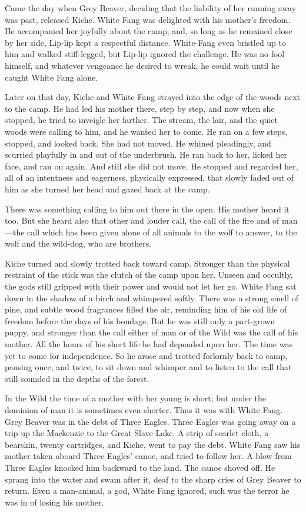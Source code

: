 \documentclass[10pt]{book}
\begin{document}
Came the day when Grey Beaver, deciding that the liability of her
running away was past, released Kiche. White Fang was delighted with
his mother’s freedom. He accompanied her joyfully about the camp; and,
so long as he remained close by her side, Lip-lip kept a respectful
distance. White-Fang even bristled up to him and walked stiff-legged,
but Lip-lip ignored the challenge. He was no fool himself, and whatever
vengeance he desired to wreak, he could wait until he caught White Fang
alone.

Later on that day, Kiche and White Fang strayed into the edge of the
woods next to the camp. He had led his mother there, step by step, and
now when she stopped, he tried to inveigle her farther. The stream, the
lair, and the quiet woods were calling to him, and he wanted her to
come. He ran on a few steps, stopped, and looked back. She had not
moved. He whined pleadingly, and scurried playfully in and out of the
underbrush. He ran back to her, licked her face, and ran on again. And
still she did not move. He stopped and regarded her, all of an
intentness and eagerness, physically expressed, that slowly faded out
of him as she turned her head and gazed back at the camp.

There was something calling to him out there in the open. His mother
heard it too. But she heard also that other and louder call, the call
of the fire and of man—the call which has been given alone of all
animals to the wolf to answer, to the wolf and the wild-dog, who are
brothers.

Kiche turned and slowly trotted back toward camp. Stronger than the
physical restraint of the stick was the clutch of the camp upon her.
Unseen and occultly, the gods still gripped with their power and would
not let her go. White Fang sat down in the shadow of a birch and
whimpered softly. There was a strong smell of pine, and subtle wood
fragrances filled the air, reminding him of his old life of freedom
before the days of his bondage. But he was still only a part-grown
puppy, and stronger than the call either of man or of the Wild was the
call of his mother. All the hours of his short life he had depended
upon her. The time was yet to come for independence. So he arose and
trotted forlornly back to camp, pausing once, and twice, to sit down
and whimper and to listen to the call that still sounded in the depths
of the forest.

In the Wild the time of a mother with her young is short; but under the
dominion of man it is sometimes even shorter. Thus it was with White
Fang. Grey Beaver was in the debt of Three Eagles. Three Eagles was
going away on a trip up the Mackenzie to the Great Slave Lake. A strip
of scarlet cloth, a bearskin, twenty cartridges, and Kiche, went to pay
the debt. White Fang saw his mother taken aboard Three Eagles’ canoe,
and tried to follow her. A blow from Three Eagles knocked him backward
to the land. The canoe shoved off. He sprang into the water and swam
after it, deaf to the sharp cries of Grey Beaver to return. Even a
man-animal, a god, White Fang ignored, such was the terror he was in of
losing his mother.
\end{document}
